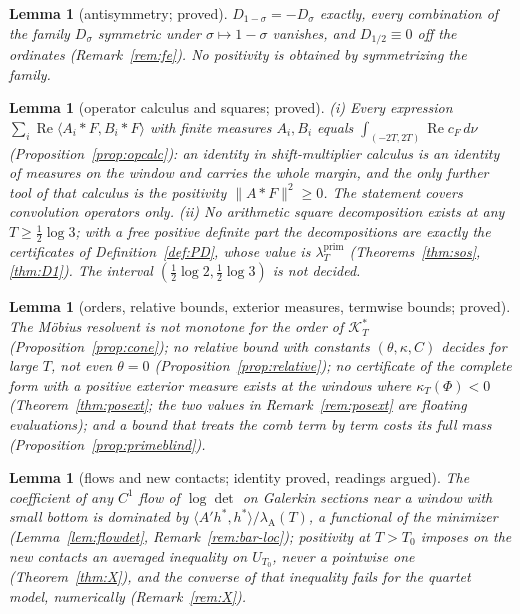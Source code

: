 \documentclass[11pt]{amsart}
\newtheorem{lemma}[theorem]{Lemma}
\theoremstyle{definition}
\theoremstyle{remark}
\newcommand{\Rel}{\operatorname{Re}}
\newcommand{\lamP}{\lambda^{\mathrm{prim}}_T}
\newcommand{\lamA}{\lambda_{\mathrm A}(T)}
\newcommand{\cF}{c_F}
\begin{document}
\begin{lemma}[antisymmetry; proved]\label{lem:shape-antisym}
$D_{1-\sigma}=-D_\sigma$ exactly, every combination of the family $D_\sigma$ symmetric under $\sigma\mapsto1-\sigma$ vanishes, and
$D_{1/2}\equiv0$ off the ordinates (Remark~\ref{rem:fe}). No positivity is obtained by symmetrizing the family.
\end{lemma}

\begin{lemma}[operator calculus and squares; proved]\label{lem:shape-lin}
\emph{(i)} Every expression $\sum_i\Rel\langle A_i*F,B_i*F\rangle$ with finite measures $A_i,B_i$ equals $\int_{(-2T,2T)}\Rel\cF\,d\nu$
(Proposition~\ref{prop:opcalc}): an identity in shift-multiplier calculus is an identity of measures on the window and carries the whole
margin, and the only further tool of that calculus is the positivity $\|A*F\|^2\ge0$. The statement covers convolution operators only.
\emph{(ii)} No arithmetic square decomposition exists at any $T\ge\frac12\log3$; with a free positive definite part the decompositions are
exactly the certificates of Definition~\ref{def:PD}, whose value is $\lamP$ (Theorems~\ref{thm:sos}, \ref{thm:D1}). The interval
$(\frac12\log2,\frac12\log3)$ is not decided.
\end{lemma}

\begin{lemma}[orders, relative bounds, exterior measures, termwise bounds; proved]\label{lem:shape-misc}
The M\"obius resolvent is not monotone for the order of $\mathcal K^*_T$ (Proposition~\ref{prop:cone}); no relative bound with constants
$(\theta,\kappa,C)$ decides for large $T$, not even $\theta=0$ (Proposition~\ref{prop:relative}); no certificate of the complete form with
a positive exterior measure exists at the windows where $\kappa_T(\Phi)<0$ (Theorem~\ref{thm:posext}; the two values in
Remark~\ref{rem:posext} are floating evaluations); and a bound that treats the comb term by term costs its full mass
(Proposition~\ref{prop:primeblind}).
\end{lemma}

\begin{lemma}[flows and new contacts; identity proved, readings argued]\label{lem:shape-flow}
The coefficient of any $C^1$ flow of $\log\det$ on Galerkin sections near a window with small bottom is dominated by
$\langle A'h^*,h^*\rangle/\lamA$, a functional of the minimizer (Lemma~\ref{lem:flowdet}, Remark~\ref{rem:bar-loc}); positivity at $T>T_0$
imposes on the new contacts an averaged inequality on $U_{T_0}$, never a pointwise one (Theorem~\ref{thm:X}), and the converse of that
inequality fails for the quartet model, numerically (Remark~\ref{rem:X}).
\end{lemma}
\end{document}
